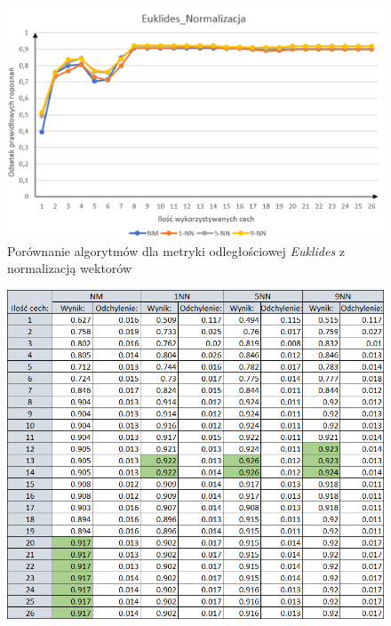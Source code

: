 \documentclass[12pt]{article}
\begin{document}
\begin{figure}[H]
	\centering
		\includegraphics[scale=0.66]{images/algorithms/euklides_norm.png}
	\caption{Porównanie algorytmów dla metryki odległościowej \textit{Euklides} z normalizacją wektorów}
\end{figure}

\begin{figure}[H]
	\centering
		\includegraphics[scale=0.8]{images/algorithms/manhatan_norm_tab.png}
	
\end{figure}
\end{document}
